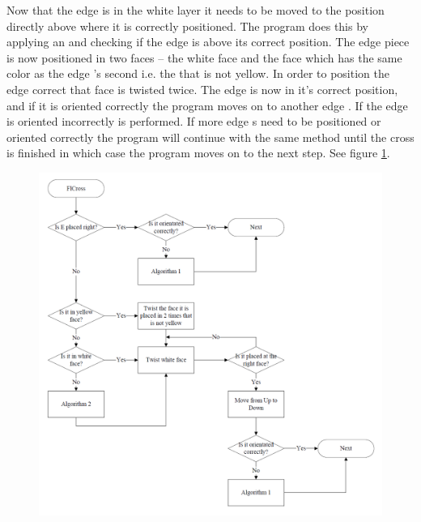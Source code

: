 Now that the edge \cpiece{} is in the white layer it needs to be moved to the position directly above where it is correctly positioned. 
The program does this by applying an  \twist{} and checking if the edge \cpiece{} is above its correct position.
The edge piece is now positioned in two faces -- the white face and the face which has the same color as the edge  \cpiece{}'s second \facelet{} i.e. the \facelet{} that is not yellow.
In order to position the edge \cpiece{} correct that face is twisted twice.
The edge \cpiece{} is now in it's correct position, and if it is oriented correctly the program moves on to another edge  \cpiece{} .
If the edge \cpiece{} is oriented incorrectly  is performed. If more edge \cpiece{}s need to be positioned or oriented correctly the program will continue with the same method until the cross is finished in which case the program moves on to the next step. See figure \ref{fig:FlCrossFlow}.

\begin{figure}[htbp]
	\centering
		\includegraphics[width = \textwidth]{input/pics/FlCrossFlow3.png}
	\caption{}
	\label{fig:FlCrossFlow}
\end{figure}

